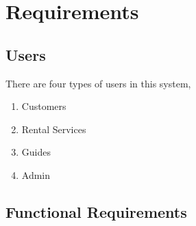 \section{Requirements}
\subsection{Users}
There are four types of users in this system,
\begin{enumerate}
\itemsep0em 
	\item Customers
	\item Rental Services
	\item Guides
	\item Admin
\end{enumerate}
\subsection{Functional Requirements}




% 

\clearpage